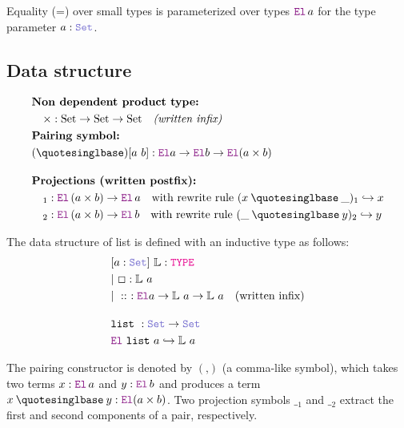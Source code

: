 Equality (=) over small types is parameterized over types $\el\,a$ for the type parameter $a : \set{}$.

\subsection{Data structure}

\begin{definition}\label{def-product}
\begin{align*}
&\textbf{Non dependent product type:} \\
&\quad \times : \text{Set} \to \text{Set} \to \text{Set} \quad \textit{(written infix)} \\
&\textbf{Pairing symbol:} \\
&(\mathbin{‚}) [a~b] : \el a \ra \el b \ra \el (a \times b)\\[1em]
&\textbf{Projections (written postfix):}  \\
&\quad {}_1 : \el\, (a \times b) \ra \el\, a \quad \text{with rewrite rule } (x \mathbin{‚} \_)_1 \re x \\
&\quad {}_2 : \el\, (a \times b) \ra \el\, b \quad \text{with rewrite rule } (\_ \mathbin{‚} y)_2 \re y
\end{align*}
\end{definition}

\begin{definition}[List]\label{def:list}
The data structure of list is defined with an inductive type as follows:
\begin{align*}
&[a: \set]~ \bb{L}: \type \\
&|~\Box : \bb{L}~a \\
&|~\mathrel{::}~: \el  a \ra \bb{L}~a \ra \bb{L}~a \quad \text{(written infix)} \\[1em]
& \kw{list}~: \set \ra \set \\
&  \el~\kw{list}~a \re \bb{L}~a
\end{align*}
\end{definition}

The pairing constructor is denoted by $(‚)$ (a comma-like symbol), which takes two terms $x : \el\,a$ and $y : \el\, b$ and produces a term $x \mathbin{‚} y : \el (a \times b)$.
Two projection symbols ${\_}_1$ and ${\_}_2$ extract the first and second components of a pair, respectively.

